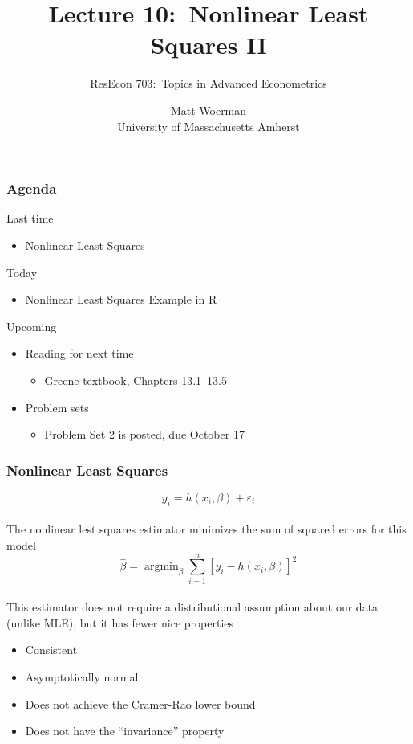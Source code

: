 \documentclass{beamer}\usepackage[]{graphicx}\usepackage[]{color}
\title[Lecture 10:\ Nonlinear Least Squares II]{Lecture 10:\ Nonlinear Least Squares II}
\author[ResEcon 703:\ Advanced Econometrics]{ResEcon 703:\ Topics in Advanced Econometrics}
\date{Matt Woerman\\University of Massachusetts Amherst}
\DeclareMathOperator*{\argmin}{argmin}
\begin{document}
{ 
\begin{frame}[noframenumbering]
    \titlepage
\end{frame}
}

\begin{frame}\frametitle{Agenda}
    Last time
    \begin{itemize}
        \item Nonlinear Least Squares
    \end{itemize}
    \vspace{2ex}
    Today
    \begin{itemize}
        \item Nonlinear Least Squares Example in R
    \end{itemize}
    \vspace{2ex}
    Upcoming
    \begin{itemize}
        \item Reading for next time
        \begin{itemize}
            \item Greene textbook, Chapters 13.1--13.5
        \end{itemize}
        \item Problem sets
        \begin{itemize}
            \item Problem Set 2 is posted, due October 17
        \end{itemize}
    \end{itemize}
\end{frame}

\begin{frame}\frametitle{Nonlinear Least Squares}
    $$y_i = h(x_i, \beta) + \varepsilon_i$$ \\
    \vspace{2ex}
    The nonlinear lest squares estimator minimizes the sum of squared errors for this model
    $$\hat{\beta} = \argmin_{\beta} \sum_{i = 1}^n [y_i - h(x_i, \beta)]^2$$ \\
    \vspace{2ex}
    This estimator does not require a distributional assumption about our data (unlike MLE), but it has fewer nice properties
    \begin{itemize}
        \item Consistent
        \item Asymptotically normal
        \item Does not achieve the Cramer-Rao lower bound
        \item Does not have the ``invariance'' property
    \end{itemize}
\end{frame}
\end{document}
